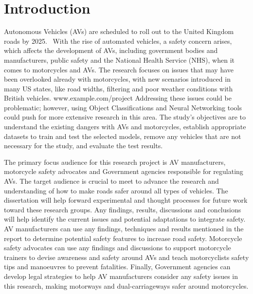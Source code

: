 \documentclass[12pt]{report} %
\begin{document}

\tableofcontents
\thispagestyle{fancy}

\newpage %
\thispagestyle{empty}
\mbox{}

\listoffigures
\thispagestyle{fancy}

\newpage %
\thispagestyle{empty}
\mbox{}

\listoftables
\thispagestyle{fancy}

\newpage %
\thispagestyle{empty}
\mbox{}


\clearpage
{} %

\chapter{Introduction}
	Autonomous Vehicles (AVs) are scheduled to roll out to the United Kingdom roads by 2025.~\cite{govuk_self-driving_2022} With the rise of automated vehicles, a safety concern arises, which affects the development of AVs, including government bodies and manufacturers, public safety and the National Health Service (NHS), when it comes to motorcycles and AVs. The research focuses on issues that may have been overlooked already with motorcycles, with new scenarios introduced in many US states, like road widths, filtering and poor weather conditions with British vehicles. 
	www.example.com/project
	Addressing these issues could be problematic; however, using Object Classifications and Neural Networking tools could push for more extensive research in this area. The study's objectives are to understand the existing dangers with AVs and motorcycles, establish appropriate datasets to train and test the selected models, remove any vehicles that are not necessary for the study, and evaluate the test results.

	The primary focus audience for this research project is AV manufacturers, motorcycle safety advocates and Government agencies responsible for regulating AVs. The target audience is crucial to meet to advance the research and understanding of how to make roads safer around all types of vehicles. The dissertation will help forward experimental and thought processes for future work toward these research groups. Any findings, results, discussions and conclusions will help identify the current issues and potential adaptations to integrate safety. AV manufacturers can use any findings, techniques and results mentioned in the report to determine potential safety features to increase road safety. Motorcycle safety advocates can use any findings and discussions to support motorcycle trainers to devise awareness and safety around AVs and teach motorcyclists safety tips and manoeuvres to prevent fatalities. Finally, Government agencies can develop legal strategies to help AV manufacturers consider any safety issues in this research, making motorways and dual-carriageways safer around motorcycles.
\end{document}
